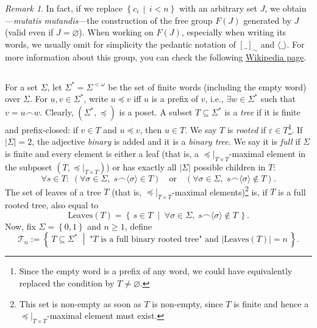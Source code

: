 \documentclass[11pt, a4paper, oneside]{article}
\theoremstyle{remark}
\newtheorem*{remark}{Remark}
\theoremstyle{lemma}
\begin{document}
\begin{remark}
In fact, if we replace $\left\{c_i \,\middle|\, i < n\right\}$ with an arbitrary set $J$, we obtain—\textit{mutatis mutandis}—the construction of the free group $F(J)$ generated by $J$ (valid even if $J = \varnothing$). When working on $F(J)$, especially when writing its words, we usually omit for simplicity the pedantic notation of $[\_]_{\sim}$ and $\langle\_\rangle$. For more information about this group, you can check the following \href{https://en.wikipedia.org/wiki/Free_group}{Wikipedia page}.
\end{remark}
\newpage
\subsection{}\label{A2}
For a set \(\Sigma\), let \(\Sigma^{*} = \Sigma^{<\omega}\) be the set of finite words (including the empty word) over \(\Sigma\). For \(u,v \in \Sigma^{*}\), write \(u \preceq v\) iff \(u\) is a prefix of \(v\), i.e., \(\exists w \in \Sigma^{*}\) such that \(v = u \frown w\). Clearly, \(\left(\Sigma^{*}, \preceq\right)\) is a poset. A subset \(T \subseteq \Sigma^{*}\) is a \textit{tree} if it is finite and prefix-closed: if \(v \in T\) and \(u \preceq v\), then \(u \in T\). We say \(T\) is \textit{rooted} if \(\varepsilon \in T\)\footnote{Since the empty word is a prefix of any word, we could have equivalently replaced the condition by \(T \neq \varnothing\).}. If \(\left|\Sigma\right| = 2\), the adjective \textit{binary} is added and it is a \textit{binary tree}. We say it is \textit{full} if \(\Sigma\) is finite and every element is either a leaf (that is, a \(\preceq|_{T \times T}\)-maximal element in the subposet \(\left(T, \preceq|_{T \times T}\right)\)) or has exactly all \(\left|\Sigma\right|\) possible children in \(T\):
\[
\forall s \in T:\;\left(\forall\sigma \in \Sigma,\; s \frown \langle \sigma\rangle \in T\right) 
\quad\text{or}\quad
\left(\forall\sigma \in \Sigma,\; s \frown \langle \sigma\rangle \notin T\right).
\]
The set of leaves of a tree \(T\) (that is, \(\preceq|_{T \times T}\)-maximal elements)\footnote{This set is non-empty as soon as \(T\) is non-empty, since \(T\) is finite and hence a \(\preceq|_{T \times T}\)-maximal element must exist.} is, if \(T\) is a full rooted tree, also equal to
\[
\mathrm{Leaves}\!\left(T\right) = \left\{\,s \in T \;\middle|\; \forall\sigma \in \Sigma,\; s \frown \langle \sigma \rangle \notin T\,\right\}.
\]
Now, fix \(\Sigma = \left\{0,1\right\}\) and \(n \geq 1\), define
\[
\mathcal{T}_n
:= \left\{\,T \subseteq \Sigma^{*} \;\middle|\; \text{"\(T\) is a full binary rooted tree" and } \left|\mathrm{Leaves}\!\left(T\right)\right| = n\,\right\}.
\]
\end{document}
